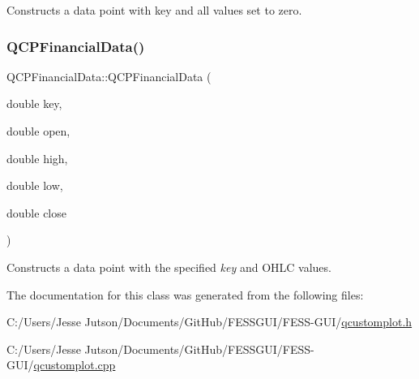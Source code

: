 Constructs a data point with key and all values set to zero. \hypertarget{class_q_c_p_financial_data_a069b72c514dfd4fc8e1d5df811e54ca4}{}\label{class_q_c_p_financial_data_a069b72c514dfd4fc8e1d5df811e54ca4} 
\subsubsection{\texorpdfstring{Q\+C\+P\+Financial\+Data()}{QCPFinancialData()}\hspace{0.1cm}{\footnotesize\ttfamily [2/2]}}
{\footnotesize\ttfamily Q\+C\+P\+Financial\+Data\+::\+Q\+C\+P\+Financial\+Data (\begin{DoxyParamCaption}\item[{double}]{key,  }\item[{double}]{open,  }\item[{double}]{high,  }\item[{double}]{low,  }\item[{double}]{close }\end{DoxyParamCaption})}

Constructs a data point with the specified {\itshape key} and O\+H\+LC values. 

The documentation for this class was generated from the following files\+:\begin{DoxyCompactItemize}
\item 
C\+:/\+Users/\+Jesse Jutson/\+Documents/\+Git\+Hub/\+F\+E\+S\+S\+G\+U\+I/\+F\+E\+S\+S-\/\+G\+U\+I/\hyperlink{qcustomplot_8h}{qcustomplot.\+h}\item 
C\+:/\+Users/\+Jesse Jutson/\+Documents/\+Git\+Hub/\+F\+E\+S\+S\+G\+U\+I/\+F\+E\+S\+S-\/\+G\+U\+I/\hyperlink{qcustomplot_8cpp}{qcustomplot.\+cpp}\end{DoxyCompactItemize}
